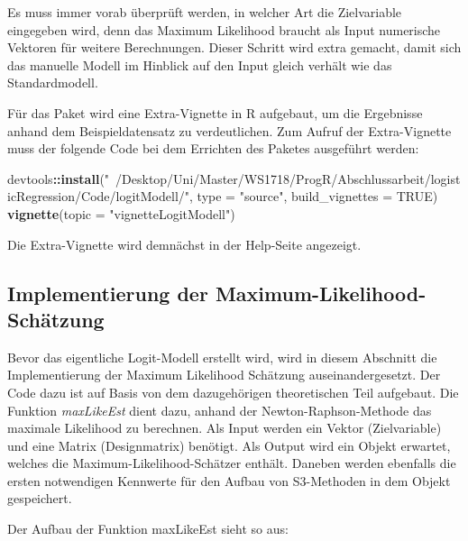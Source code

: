 \documentclass[12pt,]{article}
\newenvironment{Shaded}{\begin{snugshade}}{\end{snugshade}}
\newcommand{\KeywordTok}[1]{\textcolor[rgb]{0.13,0.29,0.53}{\textbf{#1}}}
\newcommand{\DataTypeTok}[1]{\textcolor[rgb]{0.13,0.29,0.53}{#1}}
\newcommand{\StringTok}[1]{\textcolor[rgb]{0.31,0.60,0.02}{#1}}
\newcommand{\CommentTok}[1]{\textcolor[rgb]{0.56,0.35,0.01}{\textit{#1}}}
\newcommand{\OtherTok}[1]{\textcolor[rgb]{0.56,0.35,0.01}{#1}}
\newcommand{\ControlFlowTok}[1]{\textcolor[rgb]{0.13,0.29,0.53}{\textbf{#1}}}
\newcommand{\OperatorTok}[1]{\textcolor[rgb]{0.81,0.36,0.00}{\textbf{#1}}}
\newcommand{\NormalTok}[1]{#1}
\begin{document}
Es muss immer vorab überprüft werden, in welcher Art die Zielvariable
eingegeben wird, denn das Maximum Likelihood braucht als Input
numerische Vektoren für weitere Berechnungen. Dieser Schritt wird extra
gemacht, damit sich das manuelle Modell im Hinblick auf den Input gleich
verhält wie das Standardmodell.

Für das Paket wird eine Extra-Vignette in R aufgebaut, um die Ergebnisse
anhand dem Beispieldatensatz zu verdeutlichen. Zum Aufruf der
Extra-Vignette muss der folgende Code bei dem Errichten des Paketes
ausgeführt werden:

\begin{Shaded}
\begin{Highlighting}[]
\NormalTok{devtools}\OperatorTok{::}\KeywordTok{install}\NormalTok{(}\StringTok{"~/Desktop/Uni/Master/WS1718/ProgR/Abschlussarbeit/logisticRegression/Code/logitModell/"}\NormalTok{, }\DataTypeTok{type =} \StringTok{"source"}\NormalTok{, }\DataTypeTok{build_vignettes =} \OtherTok{TRUE}\NormalTok{)}
\KeywordTok{vignette}\NormalTok{(}\DataTypeTok{topic =} \StringTok{"vignetteLogitModell"}\NormalTok{)}
\end{Highlighting}
\end{Shaded}

Die Extra-Vignette wird demnächst in der Help-Seite angezeigt.

\subsection{Implementierung der
Maximum-Likelihood-Schätzung}\label{implementierung-der-maximum-likelihood-schatzung}

Bevor das eigentliche Logit-Modell erstellt wird, wird in diesem
Abschnitt die Implementierung der Maximum Likelihood Schätzung
auseinandergesetzt. Der Code dazu ist auf Basis von dem dazugehörigen
theoretischen Teil aufgebaut. Die Funktion \emph{maxLikeEst} dient dazu,
anhand der Newton-Raphson-Methode das maximale Likelihood zu berechnen.
Als Input werden ein Vektor (Zielvariable) und eine Matrix
(Designmatrix) benötigt. Als Output wird ein Objekt erwartet, welches
die Maximum-Likelihood-Schätzer enthält. Daneben werden ebenfalls die
ersten notwendigen Kennwerte für den Aufbau von S3-Methoden in dem
Objekt gespeichert.

Der Aufbau der Funktion maxLikeEst sieht so aus:

\begin{Shaded}
\end{Shaded}
\end{document}
